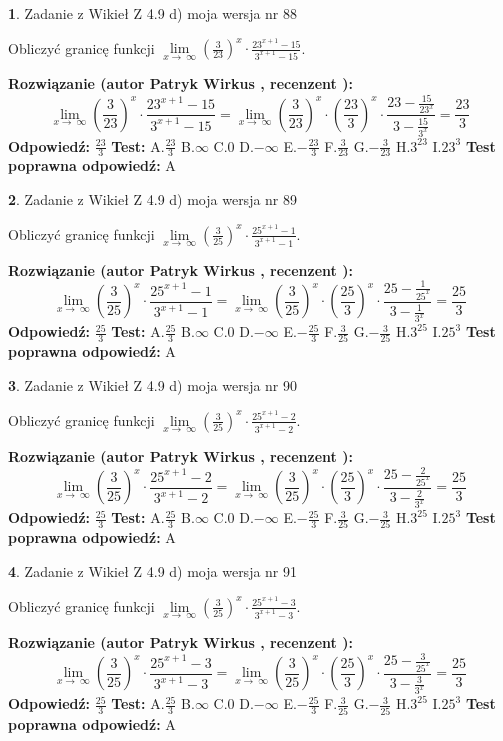 \documentclass[12pt, a4paper]{article}
\theoremstyle{definition} %
\newtheorem{zad}{}
\newcommand{\zadStart}[1]{\begin{zad}#1\newline}
\newcommand{\zadStop}{\end{zad}}
\newcommand{\rozwStart}[2]{\noindent \textbf{Rozwiązanie (autor #1 , recenzent #2): }\newline}
\newcommand{\rozwStop}{\newline}
\newcommand{\odpStart}{\noindent \textbf{Odpowiedź:}\newline}
\newcommand{\odpStop}{\newline}
\newcommand{\testStart}{\noindent \textbf{Test:}\newline}
\newcommand{\testStop}{\newline}
\newcommand{\kluczStart}{\noindent \textbf{Test poprawna odpowiedź:}\newline}
\newcommand{\kluczStop}{\newline}
\begin{document}
\zadStart{Zadanie z Wikieł Z 4.9 d) moja wersja nr 88}


Obliczyć granicę funkcji  $\lim\limits_{x\to\ \infty}(\frac{3}{23})^{x}\cdot\frac{23^{x+1}-15}{3^{x+1}-15}$.
\zadStop
\rozwStart{Patryk Wirkus}{}
$$\lim\limits_{x\to\ \infty}(\frac{3}{23})^{x}\cdot\frac{23^{x+1}-15}{3^{x+1}-15}=\lim\limits_{x\to\ \infty}(\frac{3}{23})^{x}\cdot(\frac{23}{3})^{x} \cdot \frac{23-\frac{15}{23^{x}}}{3-\frac{15}{3^{x}}} = \frac{23}{3}$$
\rozwStop
\odpStart
$\frac{23}{3}$
\odpStop
\testStart
A.$\frac{23}{3}$ B.$\infty$ C.$0$ D.$-\infty$ E.$-\frac{23}{3}$
F.$\frac{3}{23}$ G.$-\frac{3}{23}$
H.$3^{23}$
I.$23^{3}$
\testStop
\kluczStart
A
\kluczStop



\zadStart{Zadanie z Wikieł Z 4.9 d) moja wersja nr 89}


Obliczyć granicę funkcji  $\lim\limits_{x\to\ \infty}(\frac{3}{25})^{x}\cdot\frac{25^{x+1}-1}{3^{x+1}-1}$.
\zadStop
\rozwStart{Patryk Wirkus}{}
$$\lim\limits_{x\to\ \infty}(\frac{3}{25})^{x}\cdot\frac{25^{x+1}-1}{3^{x+1}-1}=\lim\limits_{x\to\ \infty}(\frac{3}{25})^{x}\cdot(\frac{25}{3})^{x} \cdot \frac{25-\frac{1}{25^{x}}}{3-\frac{1}{3^{x}}} = \frac{25}{3}$$
\rozwStop
\odpStart
$\frac{25}{3}$
\odpStop
\testStart
A.$\frac{25}{3}$ B.$\infty$ C.$0$ D.$-\infty$ E.$-\frac{25}{3}$
F.$\frac{3}{25}$ G.$-\frac{3}{25}$
H.$3^{25}$
I.$25^{3}$
\testStop
\kluczStart
A
\kluczStop



\zadStart{Zadanie z Wikieł Z 4.9 d) moja wersja nr 90}


Obliczyć granicę funkcji  $\lim\limits_{x\to\ \infty}(\frac{3}{25})^{x}\cdot\frac{25^{x+1}-2}{3^{x+1}-2}$.
\zadStop
\rozwStart{Patryk Wirkus}{}
$$\lim\limits_{x\to\ \infty}(\frac{3}{25})^{x}\cdot\frac{25^{x+1}-2}{3^{x+1}-2}=\lim\limits_{x\to\ \infty}(\frac{3}{25})^{x}\cdot(\frac{25}{3})^{x} \cdot \frac{25-\frac{2}{25^{x}}}{3-\frac{2}{3^{x}}} = \frac{25}{3}$$
\rozwStop
\odpStart
$\frac{25}{3}$
\odpStop
\testStart
A.$\frac{25}{3}$ B.$\infty$ C.$0$ D.$-\infty$ E.$-\frac{25}{3}$
F.$\frac{3}{25}$ G.$-\frac{3}{25}$
H.$3^{25}$
I.$25^{3}$
\testStop
\kluczStart
A
\kluczStop



\zadStart{Zadanie z Wikieł Z 4.9 d) moja wersja nr 91}


Obliczyć granicę funkcji  $\lim\limits_{x\to\ \infty}(\frac{3}{25})^{x}\cdot\frac{25^{x+1}-3}{3^{x+1}-3}$.
\zadStop
\rozwStart{Patryk Wirkus}{}
$$\lim\limits_{x\to\ \infty}(\frac{3}{25})^{x}\cdot\frac{25^{x+1}-3}{3^{x+1}-3}=\lim\limits_{x\to\ \infty}(\frac{3}{25})^{x}\cdot(\frac{25}{3})^{x} \cdot \frac{25-\frac{3}{25^{x}}}{3-\frac{3}{3^{x}}} = \frac{25}{3}$$
\rozwStop
\odpStart
$\frac{25}{3}$
\odpStop
\testStart
A.$\frac{25}{3}$ B.$\infty$ C.$0$ D.$-\infty$ E.$-\frac{25}{3}$
F.$\frac{3}{25}$ G.$-\frac{3}{25}$
H.$3^{25}$
I.$25^{3}$
\testStop
\kluczStart
A
\kluczStop
\end{document}
